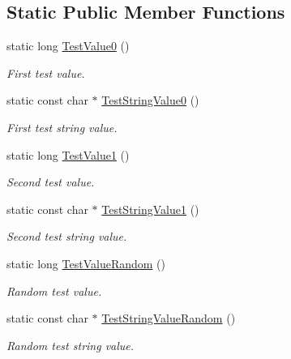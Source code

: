 \subsection*{Static Public Member Functions}
\begin{DoxyCompactItemize}
\item 
static long \hyperlink{class_c_value__long_1_1_c_value_a9da78b54b0afa6d29da214512c0e577e}{Test\+Value0} ()
\begin{DoxyCompactList}\small\item\em First test value. \end{DoxyCompactList}\item 
static const char $\ast$ \hyperlink{class_c_value__long_1_1_c_value_a968b499ab9cb7a19475ea45c51ed9a6e}{Test\+String\+Value0} ()
\begin{DoxyCompactList}\small\item\em First test string value. \end{DoxyCompactList}\item 
static long \hyperlink{class_c_value__long_1_1_c_value_ae882def98abbc6eb503aa372cc4566f3}{Test\+Value1} ()
\begin{DoxyCompactList}\small\item\em Second test value. \end{DoxyCompactList}\item 
static const char $\ast$ \hyperlink{class_c_value__long_1_1_c_value_a785ec883ee1bb84e4c84b25185663b17}{Test\+String\+Value1} ()
\begin{DoxyCompactList}\small\item\em Second test string value. \end{DoxyCompactList}\item 
static long \hyperlink{class_c_value__long_1_1_c_value_af2f5fc69991e114e1632776d77224e69}{Test\+Value\+Random} ()
\begin{DoxyCompactList}\small\item\em Random test value. \end{DoxyCompactList}\item 
static const char $\ast$ \hyperlink{class_c_value__long_1_1_c_value_a4be48c0d2c618a6497510c0d7d8dc360}{Test\+String\+Value\+Random} ()
\begin{DoxyCompactList}\small\item\em Random test string value. \end{DoxyCompactList}\end{DoxyCompactItemize}

